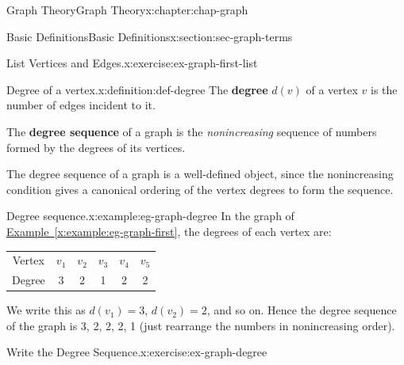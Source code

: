 \documentclass[oneside,10pt,]{book}
\newcommand{\tabularfont}{\relax}
\newcommand{\xreffont}{\relax}
\newcommand{\terminology}[1]{\textbf{#1}}
\numberwithin{equation}{section}
\newcommand{\hrulemedium}{\noalign{\hrule height 0.07em}}
\begin{document}
\begin{chapterptx}{Graph Theory}{}{Graph Theory}{}{}{x:chapter:chap-graph}
\begin{sectionptx}{Basic Definitions}{}{Basic Definitions}{}{}{x:section:sec-graph-terms}
\begin{inlineexercise}{List Vertices and Edges.}{x:exercise:ex-graph-first-list}
\begin{sidebyside}{2}{0.2}{0.2}{0.06}
\begin{sbspanel}{0.32}
{
}%
\end{sbspanel}%
\end{sidebyside}%
\end{inlineexercise}
\begin{definition}{Degree of a vertex.}{x:definition:def-degree}%
The \terminology{degree} \(d(v)\) of a vertex \(v\) is the number of edges incident to it. \label{g:notation:id488689}%
\par
The \terminology{degree sequence} of a graph is the \emph{nonincreasing} sequence of numbers formed by the degrees of its vertices.%
\end{definition}
The degree sequence of a graph is a well-defined object, since the nonincreasing condition gives a canonical ordering of the vertex degrees to form the sequence.%
\begin{example}{Degree sequence.}{x:example:eg-graph-degree}%
In the graph of \hyperref[x:example:eg-graph-first]{Example~{\xreffont\ref{x:example:eg-graph-first}}}, the degrees of each vertex are:%
\begin{sidebyside}{1}{0.3}{0.3}{0}%
\begin{sbspanel}{0.4}%
{\centering%
{\tabularfont%
\begin{tabular}{cccccc}
Vertex&\(v_1\)&\(v_2\)&\(v_3\)&\(v_4\)&\(v_5\)\tabularnewline\hrulemedium
Degree&3&2&1&2&2
\end{tabular}
}%
\par}
\end{sbspanel}%
\end{sidebyside}%
\par
We write this as \(d(v_1) = 3\), \(d(v_2) = 2\), and so on. Hence the degree sequence of the graph is 3, 2, 2, 2, 1 (just rearrange the numbers in nonincreasing order).%
\end{example}
\begin{inlineexercise}{Write the Degree Sequence.}{x:exercise:ex-graph-degree}%

\end{inlineexercise}
\end{sectionptx}
\end{chapterptx}
\end{document}
